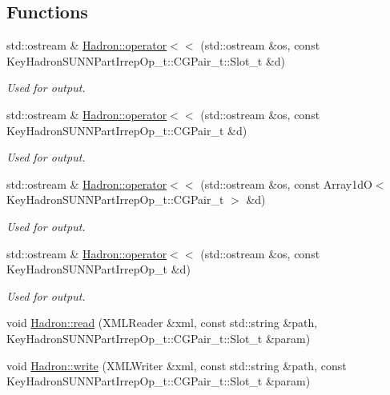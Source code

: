 \subsection*{Functions}
\begin{DoxyCompactItemize}
\item 
std\+::ostream \& \mbox{\hyperlink{namespaceHadron_adfa3adbdb4aad36d2051cad402c7266e}{Hadron\+::operator$<$$<$}} (std\+::ostream \&os, const Key\+Hadron\+S\+U\+N\+N\+Part\+Irrep\+Op\+\_\+t\+::\+C\+G\+Pair\+\_\+t\+::\+Slot\+\_\+t \&d)
\begin{DoxyCompactList}\small\item\em Used for output. \end{DoxyCompactList}\item 
std\+::ostream \& \mbox{\hyperlink{namespaceHadron_a7fcec969c306a089eacf2f042ea60ba0}{Hadron\+::operator$<$$<$}} (std\+::ostream \&os, const Key\+Hadron\+S\+U\+N\+N\+Part\+Irrep\+Op\+\_\+t\+::\+C\+G\+Pair\+\_\+t \&d)
\begin{DoxyCompactList}\small\item\em Used for output. \end{DoxyCompactList}\item 
std\+::ostream \& \mbox{\hyperlink{namespaceHadron_a608c5684c94df31a4fd84527e9508b27}{Hadron\+::operator$<$$<$}} (std\+::ostream \&os, const Array1dO$<$ Key\+Hadron\+S\+U\+N\+N\+Part\+Irrep\+Op\+\_\+t\+::\+C\+G\+Pair\+\_\+t $>$ \&d)
\begin{DoxyCompactList}\small\item\em Used for output. \end{DoxyCompactList}\item 
std\+::ostream \& \mbox{\hyperlink{namespaceHadron_a4347887ac461374a85fd726b7dece87c}{Hadron\+::operator$<$$<$}} (std\+::ostream \&os, const Key\+Hadron\+S\+U\+N\+N\+Part\+Irrep\+Op\+\_\+t \&d)
\begin{DoxyCompactList}\small\item\em Used for output. \end{DoxyCompactList}\item 
void \mbox{\hyperlink{namespaceHadron_a73f1c84ecf25af9f0187691f514b5570}{Hadron\+::read}} (X\+M\+L\+Reader \&xml, const std\+::string \&path, Key\+Hadron\+S\+U\+N\+N\+Part\+Irrep\+Op\+\_\+t\+::\+C\+G\+Pair\+\_\+t\+::\+Slot\+\_\+t \&param)
\item 
void \mbox{\hyperlink{namespaceHadron_aeeb688cdcca0a8494272d68cf2f15481}{Hadron\+::write}} (X\+M\+L\+Writer \&xml, const std\+::string \&path, const Key\+Hadron\+S\+U\+N\+N\+Part\+Irrep\+Op\+\_\+t\+::\+C\+G\+Pair\+\_\+t\+::\+Slot\+\_\+t \&param)

\end{DoxyCompactItemize}
